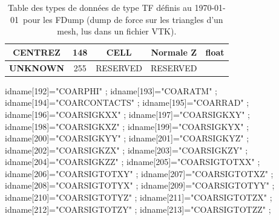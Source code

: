 \documentclass[a4paper,12pt]{article}
\begin{document}
{{{\begin{table}
\begin{minipage}{\linewidth}
\begin{tabular}{|c|c|c|c|l|}
   \color{red}CENTREZ & 148 & CELL\footnotemark[2]  & Normale Z & float \\ \hline
   \textbf{UNKNOWN} & 255 & RESERVED         & RESERVED &\\ \hline
\end{tabular}
\end{minipage}
\caption{Table des types de donn\'ees de type TF d\'efinis au \today~pour les FDump (dump de force sur les triangles d'un mesh, lus dans un fichier VTK).}
\end{table}


idname[192]="COARPHI" ;      idname[193]="COARATM" ;      idname[194]="COARCONTACTS" ; idname[195]="COARRAD" ;
idname[196]="COARSIGKXX" ;   idname[197]="COARSIGKXY" ;   idname[198]="COARSIGKXZ" ;
idname[199]="COARSIGKYX" ;   idname[200]="COARSIGKYY" ;   idname[201]="COARSIGKYZ" ;
idname[202]="COARSIGKZX" ;   idname[203]="COARSIGKZY" ;   idname[204]="COARSIGKZZ" ;
idname[205]="COARSIGTOTXX" ; idname[206]="COARSIGTOTXY" ; idname[207]="COARSIGTOTXZ" ;
idname[208]="COARSIGTOTYX" ; idname[209]="COARSIGTOTYY" ; idname[210]="COARSIGTOTYZ" ;
idname[211]="COARSIGTOTZX" ; idname[212]="COARSIGTOTZY" ; idname[213]="COARSIGTOTZZ" ;


}}}
\end{document}
